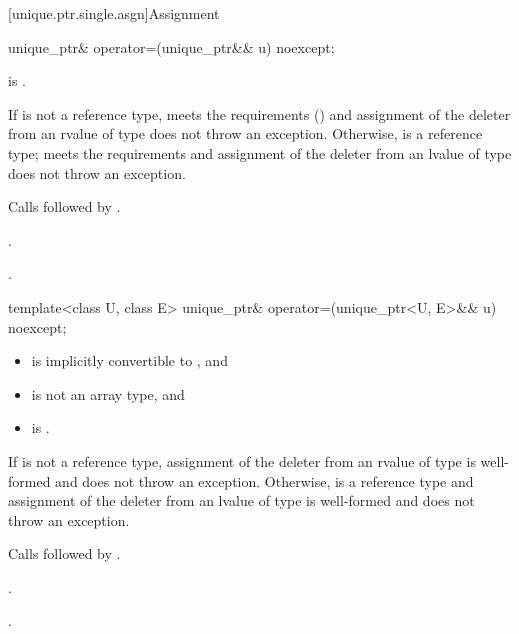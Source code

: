 [unique.ptr.single.asgn]{Assignment}

%
\begin{itemdecl}
unique_ptr& operator=(unique_ptr&& u) noexcept;
\end{itemdecl}

\begin{itemdescr}
\pnum
\constraints
{} is .

\pnum
\expects
If  is not a reference type,  meets the
 requirements () and assignment
of the deleter from an rvalue of type  does not throw an exception.
Otherwise,  is a reference type;
 meets the 
requirements and assignment of the deleter from an
lvalue of type  does not throw an exception.

\pnum
\effects
Calls  followed by
.

\pnum
\returns
{}.

\pnum
\ensures
{}.
\end{itemdescr}

%
\begin{itemdecl}
template<class U, class E> unique_ptr& operator=(unique_ptr<U, E>&& u) noexcept;
\end{itemdecl}

\begin{itemdescr}
\pnum
\constraints
\begin{itemize}
\item {} is implicitly convertible to , and
\item {} is not an array type, and
\item {} is .
\end{itemize}

\pnum
\expects
If  is not a reference type,
assignment of the deleter from an rvalue of type 
is well-formed and does not throw an exception.
Otherwise,  is a reference type and
assignment of the deleter from an lvalue of type 
is well-formed and does not throw an exception.

\pnum
\effects
Calls  followed by
.

\pnum
\returns
{}.

\pnum
\ensures
{}.
\end{itemdescr}

